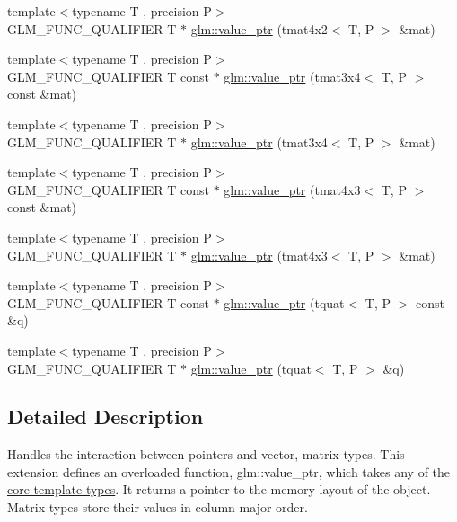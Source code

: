 \begin{DoxyCompactItemize}
\item 
{\footnotesize template$<$typename T , precision P$>$ }\\G\-L\-M\-\_\-\-F\-U\-N\-C\-\_\-\-Q\-U\-A\-L\-I\-F\-I\-E\-R T $\ast$ \hyperlink{group__gtc__type__ptr_ga0e62660f9066864568cd74d76d528a6e}{glm\-::value\-\_\-ptr} (tmat4x2$<$ T, P $>$ \&mat)
\item 
{\footnotesize template$<$typename T , precision P$>$ }\\G\-L\-M\-\_\-\-F\-U\-N\-C\-\_\-\-Q\-U\-A\-L\-I\-F\-I\-E\-R T const $\ast$ \hyperlink{group__gtc__type__ptr_gacbf08ea2313cad8a42652d4455e69709}{glm\-::value\-\_\-ptr} (tmat3x4$<$ T, P $>$ const \&mat)
\item 
{\footnotesize template$<$typename T , precision P$>$ }\\G\-L\-M\-\_\-\-F\-U\-N\-C\-\_\-\-Q\-U\-A\-L\-I\-F\-I\-E\-R T $\ast$ \hyperlink{group__gtc__type__ptr_gafac7c10d557c3db2f061af0ffe8fc9cf}{glm\-::value\-\_\-ptr} (tmat3x4$<$ T, P $>$ \&mat)
\item 
{\footnotesize template$<$typename T , precision P$>$ }\\G\-L\-M\-\_\-\-F\-U\-N\-C\-\_\-\-Q\-U\-A\-L\-I\-F\-I\-E\-R T const $\ast$ \hyperlink{group__gtc__type__ptr_ga72b0a496d6c190645accac32f48f64bb}{glm\-::value\-\_\-ptr} (tmat4x3$<$ T, P $>$ const \&mat)
\item 
{\footnotesize template$<$typename T , precision P$>$ }\\G\-L\-M\-\_\-\-F\-U\-N\-C\-\_\-\-Q\-U\-A\-L\-I\-F\-I\-E\-R T $\ast$ \hyperlink{group__gtc__type__ptr_gab9cba81cd8a7eb0afc9ac2b9f4fe05ca}{glm\-::value\-\_\-ptr} (tmat4x3$<$ T, P $>$ \&mat)
\item 
{\footnotesize template$<$typename T , precision P$>$ }\\G\-L\-M\-\_\-\-F\-U\-N\-C\-\_\-\-Q\-U\-A\-L\-I\-F\-I\-E\-R T const $\ast$ \hyperlink{group__gtc__type__ptr_ga26a38ff14840b35c57fa937711c5168c}{glm\-::value\-\_\-ptr} (tquat$<$ T, P $>$ const \&q)
\item 
{\footnotesize template$<$typename T , precision P$>$ }\\G\-L\-M\-\_\-\-F\-U\-N\-C\-\_\-\-Q\-U\-A\-L\-I\-F\-I\-E\-R T $\ast$ \hyperlink{group__gtc__type__ptr_ga637414d7a9e8877e66a59f3b3d700898}{glm\-::value\-\_\-ptr} (tquat$<$ T, P $>$ \&q)
\end{DoxyCompactItemize}


\subsection{Detailed Description}
Handles the interaction between pointers and vector, matrix types. This extension defines an overloaded function, glm\-::value\-\_\-ptr, which takes any of the \hyperlink{group__core__template}{core template types}. It returns a pointer to the memory layout of the object. Matrix types store their values in column-\/major order.

